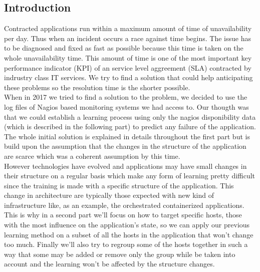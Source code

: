 \documentclass[10pt,a4paper,oneside]{article}
\begin{document}
\begin{multicols}{2}
\section{Introduction}
Contracted applications run within a maximum amount of time of unavailability per day. Thus when an incident occurs a race against time begins. The issue has to be diagnosed and fixed as fast as possible because this time is taken on the whole unavailability time. This amount of time is one of the most important key performance indicator (KPI) of an service level aggreement (SLA) contracted by indrustry class IT services. We try to find a solution that could help anticipating these problems so the resolution time is the shorter possible.
\\
When in 2017 we tried to find a solution to the problem, we decided to use the log files of Nagios based monitoring systems we had access to. Our thougth was that we could establish a learning process using only the nagios disponibility data (which is described in the following part) to predict any failure of the application. The whole initial solution is explained in details throughout the first part but is build upon the assumption that the changes in the structure of the application are scarce which was a coherent assumption by this time.
\\ However technologies have evolved and applications may have small changes in their structure on a regular basis which make any form of learning pretty difficult since the training is made with a specific structure of the application. This change in architecture are typically those expected with new kind of infrastructure like, as an example, the orchestrated containerized applications. This is why in a second part we'll focus on how to target specific hosts, those with the most influence on the application's state, so we can apply our previous learning method on a subset of all the hosts in the application that won't change too much. Finally we'll also try to regroup some of the hosts together in such a way that some may be added or remove only the group while be taken into account and the learning won't be affected by the structure changes.
\end{multicols}
\end{document}

